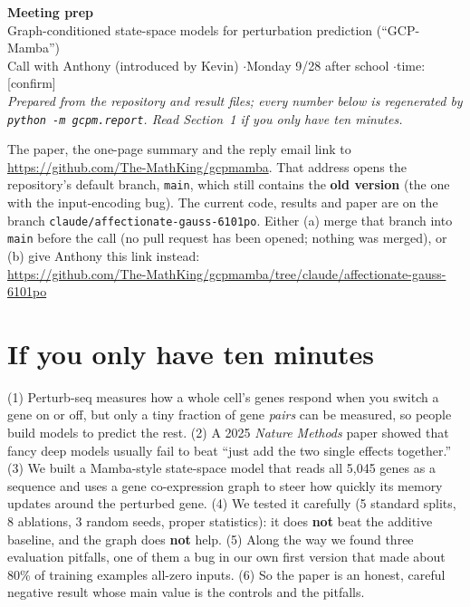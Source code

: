 \documentclass[10.5pt]{article}
\begin{document}
{\LARGE\textbf{Meeting prep}}\\[2pt]
{\large Graph-conditioned state-space models for perturbation prediction (``GCP-Mamba'')}\\[2pt]
Call with Anthony (introduced by Kevin) \quad$\cdot$\quad Monday 9/28 after school \quad$\cdot$\quad time: [confirm]\\
\textit{Prepared from the repository and result files; every number below is regenerated by
\texttt{python -m gcpm.report}. Read Section~1 if you only have ten minutes.}

\begin{warning}[title={\textbf{Fix before you send or show the code link}}]
The paper, the one-page summary and the reply email link to \url{https://github.com/The-MathKing/gcpmamba}.
That address opens the repository's default branch, \texttt{main}, which still contains the \textbf{old
version} (the one with the input-encoding bug). The current code, results and paper are on the branch
\texttt{claude/affectionate-gauss-6101po}. Either (a) merge that branch into \texttt{main} before the call
(no pull request has been opened; nothing was merged), or (b) give Anthony this link instead:\\
\url{https://github.com/The-MathKing/gcpmamba/tree/claude/affectionate-gauss-6101po}
\end{warning}

\tableofcontents

\section{If you only have ten minutes}

\begin{callout}[title={\textbf{The story in six sentences}}]
(1) Perturb-seq measures how a whole cell's genes respond when you switch a gene on or off, but only a
tiny fraction of gene \emph{pairs} can be measured, so people build models to predict the rest.
(2) A 2025 \emph{Nature Methods} paper showed that fancy deep models usually fail to beat
``just add the two single effects together.''
(3) We built a Mamba-style state-space model that reads all 5,045 genes as a sequence and uses a gene
co-expression graph to steer how quickly its memory updates around the perturbed gene.
(4) We tested it carefully (5 standard splits, 8 ablations, 3 random seeds, proper statistics): it does
\textbf{not} beat the additive baseline, and the graph does \textbf{not} help.
(5) Along the way we found three evaluation pitfalls, one of them a bug in our own first version that
made about 80\% of training examples all-zero inputs.
(6) So the paper is an honest, careful negative result whose main value is the controls and the pitfalls.
\end{callout}
\end{document}
